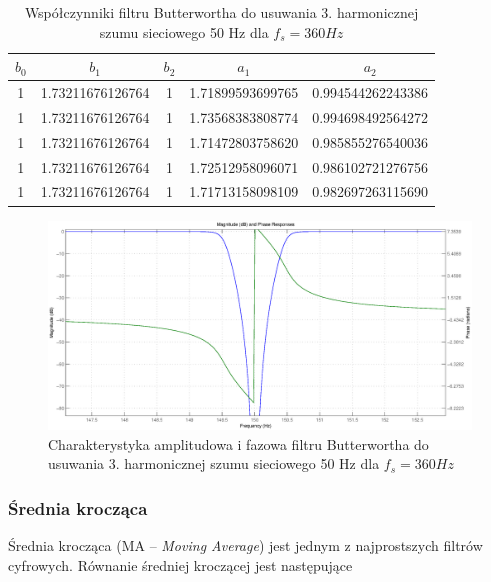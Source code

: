 \begin{table}[h]
\begin{center}
\begin{tabular}{|c|c|c|c|c|}
\hline
        $b_0$ & $b_1$ & $b_2$ & $a_1$ & $a_2$ \\
\hline
        1& 1.73211676126764& 1&        1.71899593699765& 0.994544262243386\\
\hline
        1& 1.73211676126764& 1&        1.73568383808774& 0.994698492564272\\
\hline
        1& 1.73211676126764& 1&        1.71472803758620& 0.985855276540036\\
\hline
        1& 1.73211676126764& 1&        1.72512958096071& 0.986102721276756\\
\hline
        1& 1.73211676126764& 1&        1.71713158098109& 0.982697263115690\\
\hline
\end{tabular} 
\caption{Współczynniki filtru Butterwortha do usuwania 3. harmonicznej szumu sieciowego 50 Hz dla $f_s=360 Hz$}
\label{tab:ac_3rd_360}
\end{center}
\end{table}

\begin{figure}[H]
\centering
	\includegraphics[width=\textwidth]{ECG_BASELINE/figures/3rd_harm_360.eps}
\caption{Charakterystyka amplitudowa i fazowa filtru Butterwortha do usuwania 3. harmonicznej szumu sieciowego 50 Hz dla $f_s=360 Hz$}
\label{fig:3rd_360}
\end{figure}

\subsubsection{Średnia krocząca}

Średnia krocząca (MA -- \emph{Moving Average}) jest jednym z najprostszych filtrów cyfrowych. Równanie średniej kroczącej jest następujące

